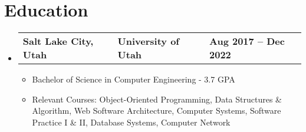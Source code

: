 \documentclass[letterpaper,11pt]{article}
\begin{document}
\begin{itemize}[leftmargin=0.05in, label={}]
\end{itemize}




\section{\textbf{Education}}
\begin{itemize}[leftmargin=0.05in, label={}]
	\item{
	            \begin{tabu} {X[l] X[c] X[r]}
		            \textbf{Salt Lake City, Utah} & \textbf{University of Utah} & \textbf{Aug 2017 -- Dec 2022} \\
	            \end{tabu}

	            \begin{itemize} [label=$\bullet$]
		            \item{Bachelor of Science in Computer Engineering - 3.7 GPA}
		            \item{Relevant Courses{: Object-Oriented Programming, Data Structures \& Algorithm, Web Software Architecture, Computer Systems, Software Practice I \& II, Database Systems, Computer Network} }
	            \end{itemize}
	      }
\end{itemize}


\end{document}
